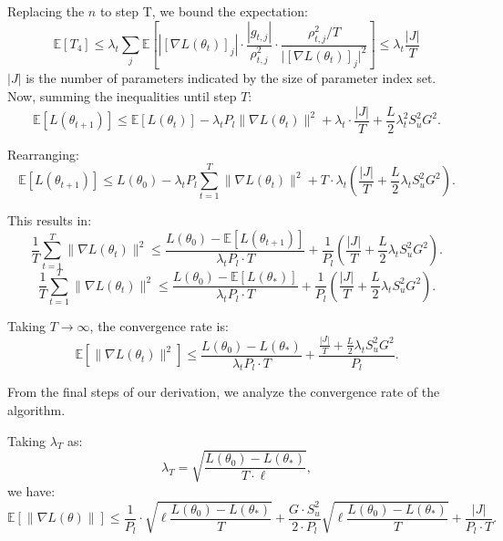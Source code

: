 \documentclass{article}
\theoremstyle{plain}
\theoremstyle{definition}
\theoremstyle{remark}
\begin{document}
\noindent
Replacing the $n$ to step T, we bound the expectation:
\begin{equation}
    \mathbb{E}[T_4] \leq \lambda_t\sum_j \mathbb{E}\left[|[\nabla L(\theta_t)]_j| \cdot \frac{|g_{t,j}|}{\rho_{t,j}^2} \cdot
    \frac{\rho_{t,j}^2/T}{\bigl|[\nabla L(\theta_t)]_j\bigr|^2}\right] \leq \lambda_t \frac{|J|}{T}
\end{equation}
$|J|$ is the number of parameters indicated by the size of parameter index set.
\noindent
Now, summing the inequalities until step $T$:
\begin{equation}
    \mathbb{E}[L(\theta_{t+1})]
    \leq \mathbb{E}[L(\theta_t)] - \lambda_t P_l \|\nabla L(\theta_t)\|^2 +\lambda_t \cdot \frac{|J|}{T}  + \frac{L}{2} \lambda_t^2 S_u^2 G^2.
\end{equation}

\noindent
Rearranging:
\begin{equation}
    \mathbb{E}[L(\theta_{t+1})]
    \leq L(\theta_0) - \lambda_t P_l \sum_{t=1}^T \|\nabla L(\theta_t)\|^2 + T \cdot \lambda_t  \left(\frac{|J|}{T} + \frac{L}{2} \lambda_t S_u^2 G^2\right).
\end{equation}

\noindent
This results in:
\begin{equation}
    \frac{1}{T} \sum_{t=1}^T \|\nabla L(\theta_t)\|^2
    \leq \frac{L(\theta_0) - \mathbb{E}[L(\theta_{t+1})]}{\lambda_t P_l \cdot T} + \frac{1}{P_l} \left(\frac{|J|}{T} + \frac{L}{2} \lambda_t S_u^{2} G^2\right).
\end{equation}
\begin{equation}
    \frac{1}{T} \sum_{t=1}^T\|\nabla L(\theta_t)\|^2
    \leq \frac{L(\theta_0) - \mathbb{E}[L(\theta_{*})]}{\lambda_t P_l \cdot T} +\frac{1}{P_l} \left(\frac{|J|}{T} + \frac{L}{2} \lambda_t S_u^{2} G^2\right).
\end{equation}

\noindent
Taking $T \to \infty$, the convergence rate is:
\begin{equation}
    \mathbb{E}[ \|\nabla L(\theta_t)\|^2]
    \leq \frac{L(\theta_0) - L(\theta_*)}{\lambda_t P_l \cdot T} + \frac{\frac{|J|}{T} + \frac{L}{2} \lambda_t S_u^{2} G^2}{P_l}.
\end{equation}

From the final steps of our derivation, we analyze the convergence rate of the algorithm.

Taking $\lambda_T$ as:
\begin{equation}
    \lambda_T = \sqrt{\frac{L(\theta_0) - L(\theta_*)}{T \cdot \ell}},
\end{equation}
we have:
\begin{equation}
    \mathbb{E}[\|\nabla L(\theta)\|] \leq \frac{1}{P_l} \cdot \sqrt{\ell\frac{L(\theta_0) - L(\theta_*)}{T}} + \frac{G \cdot S_u^{2} }{2\cdot P_l}\sqrt{\ell\frac{L(\theta_0) - L(\theta_*)}{T}} + \frac{|J|}{P_l \cdot T}.
\end{equation}
\end{document}
